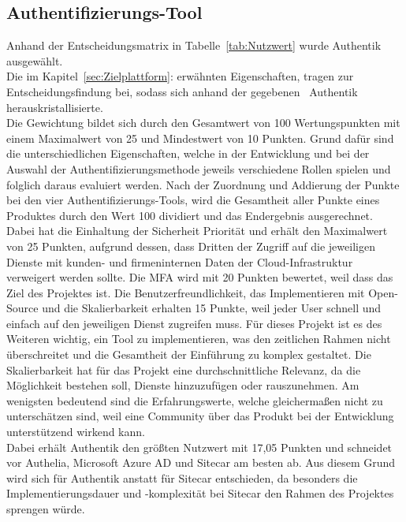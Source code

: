 \subsection{Authentifizierungs-Tool}
\label{sec:Authentifizierungs-Tool}
Anhand der Entscheidungsmatrix in Tabelle~\ref{tab:Nutzwert} wurde Authentik ausgewählt. 
\\Die im Kapitel~\ref{sec:Zielplattform}:  erwähnten Eigenschaften, tragen zur 
Entscheidungsfindung bei, sodass sich anhand der gegebenen~ Authentik herauskristallisierte.
\\Die Gewichtung bildet sich durch den Gesamtwert von 100 Wertungspunkten mit einem Maximalwert von 25 und Mindestwert von 10 Punkten. 
Grund dafür sind die unterschiedlichen Eigenschaften, welche in der Entwicklung und bei der Auswahl der 
Authentifizierungsmethode jeweils verschiedene Rollen spielen und folglich daraus evaluiert werden. Nach der Zuordnung 
und Addierung der Punkte bei den vier Authentifizierungs-Tools, wird die Gesamtheit aller Punkte eines Produktes durch den 
Wert 100 dividiert und das Endergebnis ausgerechnet. Dabei hat die Einhaltung der Sicherheit Priorität und erhält den 
Maximalwert von 25 Punkten, aufgrund dessen, dass Dritten der Zugriff auf die jeweiligen Dienste mit kunden- und 
firmeninternen Daten der Cloud-Infrastruktur verweigert werden sollte. Die \acs{MFA} wird mit 20 Punkten bewertet, weil 
dass das Ziel des Projektes ist. Die Benutzerfreundlichkeit, das Implementieren mit Open-Source und die Skalierbarkeit 
erhalten 15 Punkte, weil jeder User schnell und einfach auf den jeweiligen Dienst zugreifen muss. 
Für dieses Projekt ist es des Weiteren wichtig, ein Tool zu implementieren, was den zeitlichen Rahmen nicht überschreitet und die 
Gesamtheit der Einführung zu komplex gestaltet. Die Skalierbarkeit hat für das Projekt eine durchschnittliche Relevanz, da die 
Möglichkeit bestehen soll, Dienste hinzuzufügen oder rauszunehmen. Am wenigsten bedeutend sind die Erfahrungswerte, welche 
gleichermaßen nicht zu unterschätzen sind, weil eine Community über das Produkt bei der Entwicklung unterstützend wirkend kann.
\\Dabei erhält Authentik den größten Nutzwert mit 17,05 Punkten und schneidet vor Authelia, Microsoft Azure AD und Sitecar am besten ab. 
Aus diesem Grund wird sich für Authentik anstatt für Sitecar entschieden, da besonders die Implementierungsdauer und -komplexität 
bei Sitecar den Rahmen des Projektes sprengen würde.

